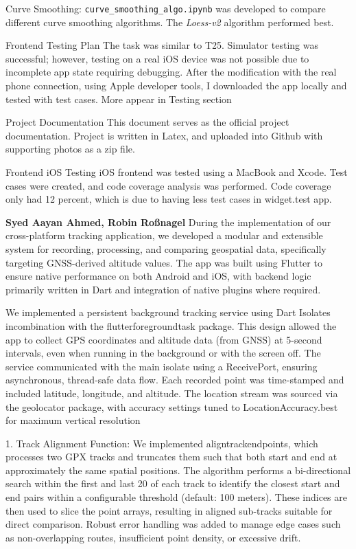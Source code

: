 \documentclass[12pt]{article}
\begin{document}
Curve Smoothing: \texttt{curve\_smoothing\_algo.ipynb} was developed to compare different curve smoothing algorithms. The \textit{Loess-v2} algorithm performed best.

Frontend Testing Plan
The task was similar to T25. Simulator testing was successful; however, testing on a real iOS device was not possible due to incomplete app state requiring debugging.
After the modification with the real phone connection, using Apple developer tools, I downloaded the app locally and tested with test cases. More appear in Testing section

Project Documentation
This document serves as the official project documentation. Project is written in Latex, and uploaded into Github with supporting photos as a zip file.

Frontend iOS Testing
iOS frontend was tested using a MacBook and Xcode. Test cases were created, and code coverage analysis was performed. Code coverage only had 12 percent, which is due to having less test cases in widget.test app. 

\vspace{1em}

{\large\textbf{Syed  Aayan Ahmed, Robin Roßnagel }}
During the implementation of our cross-platform tracking application, we developed a modular and extensible system for recording, processing, and comparing geospatial data,
specifically targeting GNSS-derived altitude values. The app was built using Flutter to ensure native performance on both Android and iOS, with backend logic primarily written in Dart
and integration of native plugins where required.

We implemented a persistent background tracking service using Dart Isolates incombination with the flutterforegroundtask package. This design allowed the app to collect GPS coordinates and altitude data (from GNSS) at 5-second intervals, even when running in the background or with the screen off. The service communicated with the main
isolate using a ReceivePort, ensuring asynchronous, thread-safe data flow. Each recorded point was time-stamped and included latitude, longitude, and altitude. The location stream
was sourced via the geolocator package, with accuracy settings tuned to LocationAccuracy.best for maximum vertical resolution

1. Track Alignment Function:
We implemented aligntrackendpoints, which processes two GPX tracks and
truncates them such that both start and end at approximately the same spatial
positions. The algorithm performs a bi-directional search within the first and last 20%
of each track to identify the closest start and end pairs within a configurable
threshold (default: 100 meters). These indices are then used to slice the point arrays,
resulting in aligned sub-tracks suitable for direct comparison. Robust error handling
was added to manage edge cases such as non-overlapping routes, insufficient point
density, or excessive drift.
\end{document}
